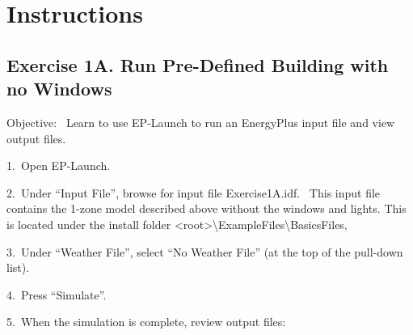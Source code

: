 \section{Instructions}\label{instructions-000}

\subsection{Exercise 1A. Run Pre-Defined Building with no Windows}\label{exercise-1a.-run-pre-defined-building-with-no-windows}

Objective:~ Learn to use EP-Launch to run an EnergyPlus input file and view output files.

1.~Open EP-Launch.

2.~Under ``Input File'', browse for input file Exercise1A.idf.~ This input file contains the 1-zone model described above without the windows and lights. This is located under the install folder \textless{}root\textgreater{}\textbackslash{}ExampleFiles\textbackslash{}BasicsFiles,

3.~Under ``Weather File'', select ``No Weather File'' (at the top of the pull-down list).

4.~Press ``Simulate''.

5.~When the simulation is complete, review output files:

